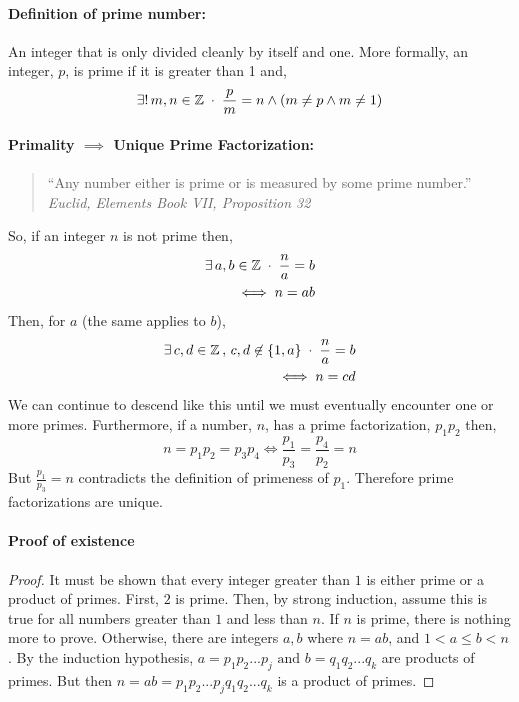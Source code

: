 \documentclass[MathsNotesBase.tex]{subfiles}
\begin{document}
{		\paragraph{Definition of prime number:} An integer that is only divided cleanly by itself and one.
		More formally, an integer, $p$, is prime if it is greater than 1 and,
		\[ \exists!\,m,n \in \mathbb{Z}^{\;} \cdot \;\frac{p}{m} = n \wedge (m \neq p \wedge m \neq 1) \]
		
		\paragraph{Primality $ \implies $ Unique Prime Factorization:}
		\begin{quote}
			``Any number either is prime or is measured by some prime number.''\\
			\textit{Euclid, Elements Book VII, Proposition 32}
		\end{quote}
		So, if an integer $n$ is not prime then,
		\begin{align*} 
		\exists\,a,b \in \mathbb{Z}^{\;} \cdot \; \frac{n}{a} = b \\
		\iff n = ab
		\end{align*}
		Then, for $a$ (the same applies to $b$),
		\begin{align*}
		\exists\,c,d \in \mathbb{Z}^{\,},\,c,d \not\in \{1,a\}\; \cdot \; \frac{n}{a} = b \\
		\iff n = cd
		\end{align*}
		We can continue to descend like this until we must eventually encounter one or more primes.
		Furthermore, if a number, $n$, has a prime factorization, $p_1p_2$ then,
		\[ n = p_1p_2 = p_3p_4 \iff \frac{p_1}{p_3} = \frac{p_4}{p_2} = n \]
		But $\frac{p_1}{p_3} = n$ contradicts the definition of primeness of $p_1$. Therefore prime factorizations are unique.
		
		\paragraph{Proof of existence}
		\begin{proof}
			It must be shown that every integer greater than $ 1 $ is either prime or a product of primes. First, $ 2 $ is prime. Then, by strong induction, assume this is true for all numbers greater than $ 1 $ and less than $ n $. 
			If $ n $ is prime, there is nothing more to prove. 
			Otherwise, there are integers $ a, b $ where $ n = ab $, and $ 1 < a \leq b < n $. By the induction hypothesis, $ a = p_1p_2...p_j \text{ and } b = q_1q_2...q_k $ are products of primes. But then $ n = ab = p_1p_2...p_jq_1q_2...q_k $ is a product of primes.
		\end{proof}
		
}
\end{document}
